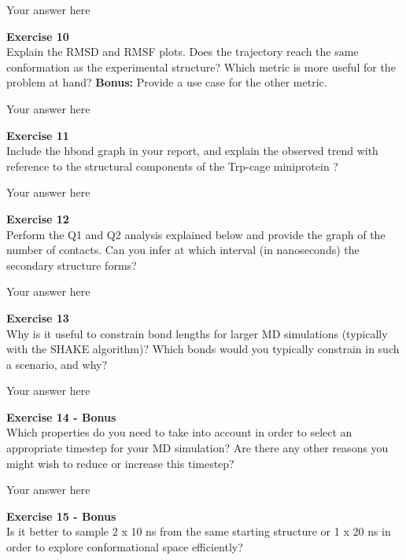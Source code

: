 \documentclass{article}
\begin{document}
Your answer here

\begin{mdframed}
\textbf{Exercise 10}\\
Explain the RMSD and RMSF plots.  Does the trajectory reach the same conformation as the experimental structure?
Which metric is more useful for the problem at hand? \textbf{Bonus:}  Provide a use case for the other metric.
\end{mdframed}

Your answer here

\begin{mdframed}
\textbf{Exercise 11}\\
Include the hbond graph in your report, and explain the observed trend with reference to the structural components of the Trp-cage miniprotein ?
\end{mdframed}

Your answer here

\begin{mdframed}
\textbf{Exercise 12}\\
Perform the Q1 and Q2 analysis explained below and provide the graph of the number of contacts. Can you infer at which interval (in nanoseconds) the secondary structure forms?
\end{mdframed}

Your answer here

\begin{mdframed}
\textbf{Exercise 13}\\
Why is it useful to constrain bond lengths for larger MD simulations (typically with the SHAKE algorithm)? Which bonds would you typically constrain in such a scenario, and why?
\end{mdframed}

Your answer here

\begin{mdframed}
\textbf{Exercise 14 - Bonus}\\
Which properties do you need to take into account in order to select an appropriate timestep for your MD simulation? Are there any other reasons you might wish to reduce or increase this timestep?
\end{mdframed}

Your answer here

\begin{mdframed}
\textbf{Exercise 15 - Bonus}\\
Is it better to sample 2 x 10 ns from the same starting structure or 1 x 20 ns in order to explore conformational space efficiently?
\end{mdframed}
\end{document}
